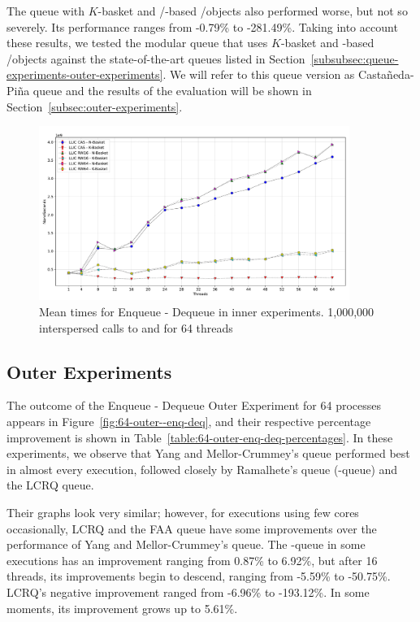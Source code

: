The queue with \(K\)-basket and \R/\W-based \LL/\IC objects also performed worse, but not so severely. Its performance ranges from -0.79\% to -281.49\%. Taking into account these results, we tested the modular queue that uses \(K\)-basket and \CAS-based \LL/\IC objects against the state-of-the-art queues listed in Section~\ref{subsubsec:queue-experiments-outer-experiments}. We will refer to this queue version as Castañeda-Piña queue and the results of the evaluation will be shown in Section~\ref{subsec:outer-experiments}.

\begin{figure}[ht!]
  \centering
  \includegraphics[width=0.9\textwidth]{contents/figures/V_64_inner_enq_deq_all.pdf}
  \caption{\label{fig:64-inner-enq-deq} Mean times for Enqueue - Dequeue in inner experiments. 1,000,000 interspersed calls to \Enq and \Deq  for 64 threads}
\end{figure}

%



\subsection{\label{subsec:outer-experiments}Outer Experiments}

The outcome of the Enqueue - Dequeue Outer Experiment for 64 processes appears in Figure~\ref{fig:64-outer--enq-deq}, and their respective percentage improvement is shown in Table~\ref{table:64-outer-enq-deq-percentages}. In these experiments, we observe that Yang and Mellor-Crummey's queue performed best in almost every execution, followed closely by Ramalhete's \FAI queue (\FAI-queue) and the LCRQ queue.


Their graphs look very similar; however, for executions using few cores occasionally, LCRQ and the FAA queue have some improvements over the performance of Yang and Mellor-Crummey's queue. The \FAI-queue in some executions has an improvement ranging from 0.87\% to 6.92\%, but after 16 threads, its improvements begin to descend, ranging from -5.59\% to -50.75\%. LCRQ's negative improvement ranged from -6.96\% to -193.12\%. In some moments, its improvement grows up to 5.61\%.


